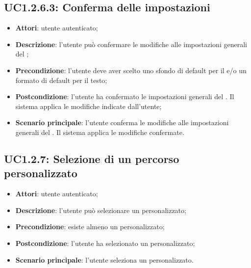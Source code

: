 \subsection{UC1.2.6.3: Conferma delle impostazioni}
\label{UC1.2.6.3}
\begin{itemize}
\item \textbf{Attori}: utente autenticato;
\item \textbf{Descrizione}: l'utente può confermare le modifiche alle impostazioni generali del ;
\item \textbf{Precondizione}: l'utente deve aver scelto uno sfondo di default per il  e/o un formato di default per il testo;
\item \textbf{Postcondizione}: l'utente ha confermato le impostazioni generali del . Il sistema applica le modifiche indicate dall'utente;
\item \textbf{Scenario principale}:
l'utente conferma le modifiche alle impostazioni generali del . Il sistema applica le modifiche confermate.
\end{itemize}
\subsection{UC1.2.7: Selezione di un percorso personalizzato}
\label{UC1.2.7}
\begin{itemize}
\item \textbf{Attori}: utente autenticato;
\item \textbf{Descrizione}: l'utente può selezionare un  personalizzato;
\item \textbf{Precondizione}: esiste almeno un  personalizzato;
\item \textbf{Postcondizione}: l'utente ha selezionato un  personalizzato;
\item \textbf{Scenario principale}:
l'utente seleziona un  personalizzato.
\end{itemize}
